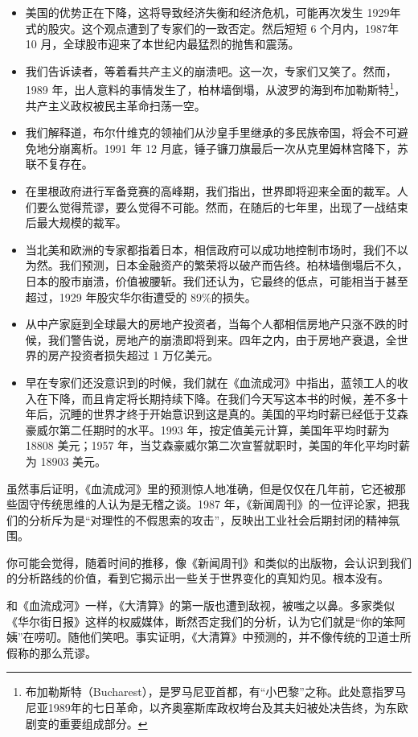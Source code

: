 \begin{itemize}
    \item 美国的优势正在下降，这将导致经济失衡和经济危机，可能再次发生 1929年式的股灾。这个观点遭到了专家们的一致否定。然后短短 6 个月内，1987年 10 月，全球股市迎来了本世纪内最猛烈的抛售和震荡。
    \item 我们告诉读者，等着看共产主义的崩溃吧。这一次，专家们又笑了。然而，1989 年，出人意料的事情发生了，柏林墙倒塌，从波罗的海到布加勒斯特\footnote{布加勒斯特（Bucharest），是罗马尼亚首都，有“小巴黎”之称。此处意指罗马尼亚1989年的七日革命，以齐奥塞斯库政权垮台及其夫妇被处决告终，为东欧剧变的重要组成部分。}，共产主义政权被民主革命扫荡一空。
    \item 我们解释道，布尔什维克的领袖们从沙皇手里继承的多民族帝国，将会不可避免地分崩离析。1991 年 12 月底，锤子镰刀旗最后一次从克里姆林宫降下，苏联不复存在。
    \item 在里根政府进行军备竞赛的高峰期，我们指出，世界即将迎来全面的裁军。人们要么觉得荒谬，要么觉得不可能。然而，在随后的七年里，出现了一战结束后最大规模的裁军。
    \item 当北美和欧洲的专家都指着日本，相信政府可以成功地控制市场时，我们不以为然。我们预测，日本金融资产的繁荣将以破产而告终。柏林墙倒塌后不久，日本的股市崩溃，价值被腰斩。我们还认为，它最终的低点，可能相当于甚至超过，1929 年股灾华尔街遭受的 89\%的损失。
    \item 从中产家庭到全球最大的房地产投资者，当每个人都相信房地产只涨不跌的时候，我们警告说，房地产的崩溃即将到来。四年之内，由于房地产衰退，全世界的房产投资者损失超过 1 万亿美元。
    \item 早在专家们还没意识到的时候，我们就在《血流成河》中指出，蓝领工人的收入在下降，而且肯定将长期持续下降。在我们今天写这本书的时候，差不多十年后，沉睡的世界才终于开始意识到这是真的。美国的平均时薪已经低于艾森豪威尔第二任期时的水平。1993 年，按定值美元计算，美国年平均时薪为 18808 美元；1957 年，当艾森豪威尔第二次宣誓就职时，美国的年化平均时薪为 18903 美元。
\end{itemize}


虽然事后证明，《血流成河》里的预测惊人地准确，但是仅仅在几年前，它还被那些固守传统思维的人认为是无稽之谈。1987 年，《新闻周刊》的一位评论家，把我们的分析斥为是“对理性的不假思索的攻击”，反映出工业社会后期封闭的精神氛围。

你可能会觉得，随着时间的推移，像《新闻周刊》和类似的出版物，会认识到我们的分析路线的价值，看到它揭示出一些关于世界变化的真知灼见。根本没有。

和《血流成河》一样，《大清算》的第一版也遭到敌视，被嗤之以鼻。多家类似《华尔街日报》这样的权威媒体，断然否定我们的分析，认为它们就是“你的笨阿姨”在唠叨。随他们笑吧。事实证明，《大清算》中预测的，并不像传统的卫道士所假称的那么荒谬。

